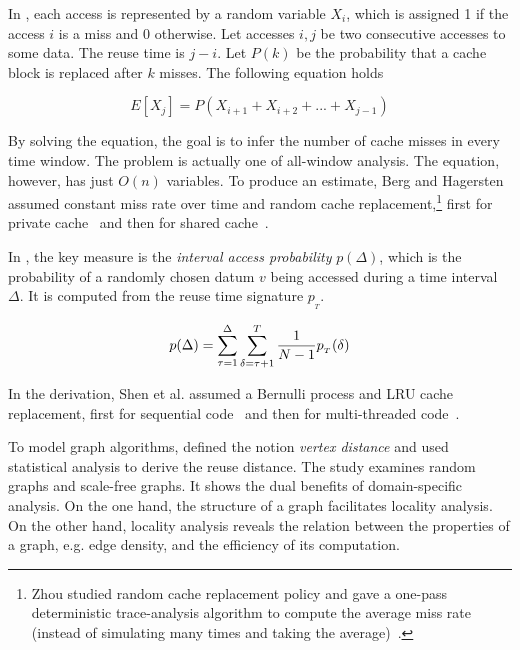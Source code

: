In \citet{BergH:ISPASS04},
each access is represented by a random
variable $X_i$, which is assigned 1 if the access $i$ is a miss and 0
otherwise.  Let accesses $i,j$ be two consecutive accesses to some
data.  The reuse time is $j-i$.  Let $P(k)$ be the probability that a
cache block is replaced after $k$ misses.  The following equation
holds

$$E[X_j] = P(X_{i+1}+X_{i+2}+...+X_{j-1})$$

By solving the equation, the goal is to infer the number of cache
misses in every time window.  The problem is actually one of
all-window analysis.  The equation, however, has just $O(n)$
variables.  To produce an estimate, Berg and Hagersten assumed
constant miss rate over time and random cache replacement,\footnote{Zhou studied random cache replacement policy and gave a
one-pass deterministic trace-analysis algorithm to compute the average
miss rate (instead of simulating many times and taking the
average)~\citep{Zhou:NPC10}.} first for
private cache~\citep{BergH:ISPASS04,BergH:SIGMETRICS05} and then for
shared cache~\citep{EklovH:ISPASS10,Eklov+:HiPEAC11}.  

In \citet{Shen+:POPL07}, the key measure is the \emph{interval access
probability} $p(\Delta)$, which is the probability of a randomly chosen
datum $v$ being accessed during a time interval $\Delta$.  It
is computed from the reuse time signature $p_{{}_T}$.

\begin{equation*}
p(\Delta) = \sum_{\tau=1}^\Delta \sum_{\delta=\tau+1}^T
{1\over{N-1}}p_{{}_T}(\delta)
\label{eq:pDelta}
\end{equation*}

\noindent In the derivation, Shen et al. assumed a Bernulli process and LRU
cache replacement, first for sequential
code~\citep{Shen+:POPL07,ShenS:LCPC08} and then for multi-threaded
code~\citep{Jiang+:CC10,Jiang+:HiPEAC10}.  

To model graph algorithms, \citet{Yuan+:ICPP12} defined the notion
\emph{vertex distance} and used statistical analysis to derive the
reuse distance.  The study examines random graphs and scale-free
graphs.  It shows the dual benefits of domain-specific analysis.  On
the one hand, the structure of a graph facilitates locality analysis.
On the other hand, locality analysis reveals the relation between the
properties of a graph, e.g.  edge density, and the efficiency of its
computation.


